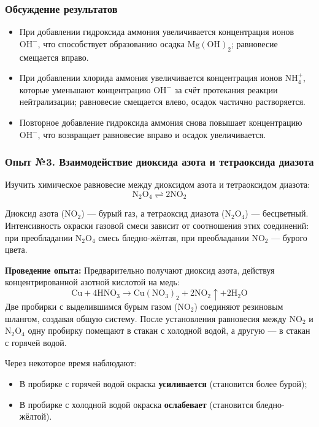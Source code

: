 \documentclass[a4paper,12pt]{article}
\begin{document}
	\subsubsection*{Обсуждение результатов}
	
	\begin{itemize}
		\item При добавлении гидроксида аммония увеличивается концентрация ионов \(\mathrm{OH^-}\), что способствует образованию осадка \(\mathrm{Mg(OH)_2}\); равновесие смещается вправо.
		\item При добавлении хлорида аммония увеличивается концентрация ионов \(\mathrm{NH_4^+}\), которые уменьшают концентрацию \(\mathrm{OH^-}\) за счёт протекания реакции нейтрализации; равновесие смещается влево, осадок частично растворяется.
		\item Повторное добавление гидроксида аммония снова повышает концентрацию \(\mathrm{OH^-}\), что возвращает равновесие вправо и осадок увеличивается.
	\end{itemize}

	\subsubsection*{Опыт №3. Взаимодействие диоксида азота и тетраоксида диазота}
	
	Изучить химическое равновесие между диоксидом азота и тетраоксидом диазота:
	\[
	\mathrm{N_2O_4 \rightleftharpoons 2NO_2}
	\]
	
	Диоксид азота (\(\mathrm{NO_2}\)) — бурый газ, а тетраоксид диазота (\(\mathrm{N_2O_4}\)) — бесцветный.  
	Интенсивность окраски газовой смеси зависит от соотношения этих соединений: при преобладании \(\mathrm{N_2O_4}\) смесь бледно-жёлтая, при преобладании \(\mathrm{NO_2}\) — бурого цвета.
	
	\textbf{Проведение опыта:}  
	Предварительно получают диоксид азота, действуя концентрированной азотной кислотой на медь:
	\[
	\mathrm{Cu + 4HNO_3 \rightarrow Cu(NO_3)_2 + 2NO_2 \uparrow + 2H_2O}
	\]
	Две пробирки с выделившимся бурым газом (\(\mathrm{NO_2}\)) соединяют резиновым шлангом, создавая общую систему. После установления равновесия между \(\mathrm{NO_2}\) и \(\mathrm{N_2O_4}\) одну пробирку помещают в стакан с холодной водой, а другую — в стакан с горячей водой.
	
	Через некоторое время наблюдают:
	\begin{itemize}
		\item В пробирке с горячей водой окраска \textbf{усиливается} (становится более бурой);
		\item В пробирке с холодной водой окраска \textbf{ослабевает} (становится бледно-жёлтой).
	\end{itemize}
	
\end{document}
